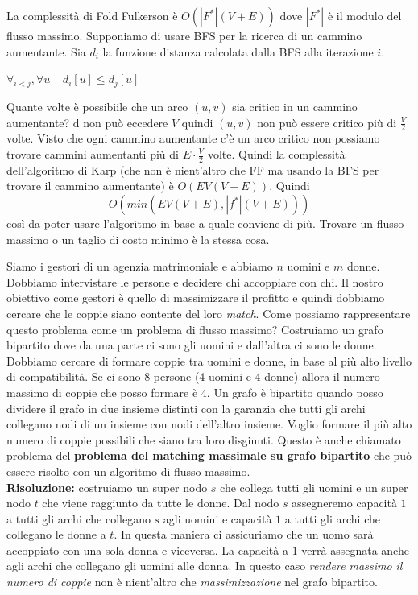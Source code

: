 \documentclass[a4paper]{article}
\begin{document}
\noindent
La complessità di Fold Fulkerson è $O(|F^\ast|(V+E))$ dove $|F^\ast|$ è il modulo del flusso massimo. 
Supponiamo di usare BFS per la ricerca di un cammino aumentante. Sia $d_i$ la funzione distanza calcolata dalla BFS alla iterazione $i$. 
\begin{lemma}
  $\forall_{i < j}, \forall u \; \; \; \;  d_i[u] \le d_j[u]$ 
\end{lemma}
Quante volte è possibiile che un arco $(u,v)$ sia critico in un cammino aumentante?
d non può eccedere $V$ quindi $(u,v)$ non può essere critico più di $\frac{V}{2}$ volte. 
Visto che ogni cammino aumentante c'è un arco critico non possiamo trovare cammini aumentanti più di $E \cdot \frac{V}{2}$ volte.
Quindi la complessità dell'algoritmo di Karp (che non è nient'altro che FF ma usando la BFS per trovare il cammino aumentante) è $O(EV(V+E))$.
Quindi \[O(min(EV(V+E), |f^\ast|(V+E)))\]
così da poter usare l'algoritmo in base a quale conviene di più.
Trovare un flusso massimo o un taglio di costo minimo è la stessa cosa. 

\ex{}
{
  Siamo i gestori di un agenzia matrimoniale e abbiamo $n$ uomini e $m$ donne. Dobbiamo intervistare le persone e decidere chi accoppiare con chi. 
  Il nostro obiettivo come gestori è quello di massimizzare il profitto e quindi dobbiamo cercare che le coppie siano contente del loro \textit{match}.
  Come possiamo rappresentare questo problema come un problema di flusso massimo?
  Costruiamo un grafo bipartito dove da una parte ci sono gli uomini e dall'altra ci sono le donne. 
  Dobbiamo cercare di formare coppie tra uomini e donne, in base al più alto livello di compatibilità. Se ci sono 8 persone (4 uomini e 4 donne) allora
  il numero massimo di coppie che posso formare è $4$. 
  Un grafo è bipartito quando posso dividere il grafo in due insieme distinti con la garanzia che tutti gli archi collegano nodi di un insieme con nodi dell'altro insieme.
  Voglio formare il più alto numero di coppie possibili che siano tra loro disgiunti.  Questo è anche chiamato problema del \textbf{problema del matching massimale su grafo bipartito} 
  che può essere risolto con un algoritmo di flusso massimo.
  \\
  \textbf{Risoluzione: }
  costruiamo un super nodo $s$ che collega tutti gli uomini e un super nodo $t$ che viene raggiunto da tutte le donne.
  Dal nodo $s$ assegneremo capacità $1$ a tutti gli archi che collegano $s$ agli uomini e capacità $1$ a tutti gli archi che collegano le donne a $t$.
  In questa maniera ci assicuriamo che un uomo sarà accoppiato con una sola donna e viceversa.
  La capacità a $1$ verrà assegnata anche agli archi che collegano gli uomini alle donna. 
  In questo caso \textit{rendere massimo il numero di coppie} non è nient'altro che \textit{massimizzazione} nel grafo bipartito.


} 
\end{document}
